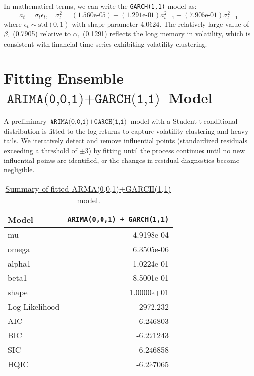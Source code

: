 \documentclass{article}
\newcommand{\1}{\mathbbm{1}}
\theoremstyle{definition}
\begin{document}
In mathematical terms, we can write the \texttt{GARCH(1,1)} model as:
$$a_t = \sigma_t \epsilon_t, \quad \sigma^2_t = (\text{1.560e-05}) + (\text{1.291e-01})a^2_{t-1} + (\text{7.905e-01})\sigma^2_{t-1}$$
where $\epsilon_t \sim \text{std}(0,1)$ with shape parameter 4.0624. The relatively large value of $\beta_1$ (0.7905) relative to $\alpha_1$ (0.1291) reflects the long memory in volatility, which is consistent with financial time series exhibiting volatility clustering.






\section{Fitting Ensemble $\texttt{ARIMA(0,0,1)}+\texttt{GARCH(1,1)}$ Model}

A preliminary $\texttt{ARIMA(0,0,1)}+\texttt{GARCH(1,1)}$ model with a Student-t conditional distribution is fitted to the log returns to capture volatility clustering and heavy tails. We iteratively detect and remove influential points (standardized residuals exceeding a threshold of $\pm 3$) by fitting until the process continues until no new influential points are identified, or the changes in residual diagnostics become negligible.

\begin{table}[H]
\centering
\begin{tabular}{l|r}
\hline
\textbf{Model}  & \texttt{ARIMA(0,0,1) + GARCH(1,1)} \\
\hline
mu & 4.9198e-04 \\
omega  & 6.3505e-06 \\
alpha1      & 1.0224e-01 \\
beta1 & 8.5001e-01\\
shape & 1.0000e+01\\
\hline
Log-Likelihood  & 2972.232\\
AIC             & -6.246803\\
BIC             & -6.221243\\
SIC             & -6.246858\\
HQIC            & -6.237065\\
\hline
\end{tabular}
\caption{\small{\href{https://github.com/Stochastic1017/Walmart-Stock-Forecasting/blob/main/R/Fit_ARMA_and_GARCH.R}{Summary of fitted ARMA(0,0,1)+GARCH(1,1) model.}}}
\label{tab:arma_model_summary}
\end{table}
\end{document}
